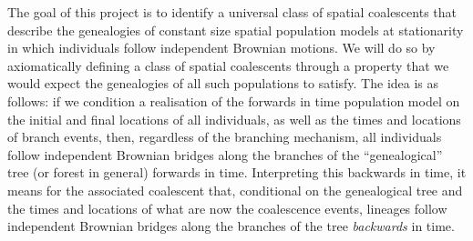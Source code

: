 \documentclass[reqno,draft]{amsart}
\numberwithin{equation}{section}
\theoremstyle{plain}
\theoremstyle{remark}
\begin{document}
The goal of this project is to identify a universal class of spatial coalescents that describe the genealogies of constant size spatial population models at stationarity in which individuals follow independent Brownian motions. We will do so by axiomatically defining a class of spatial coalescents through a property that we would expect the genealogies of all such populations to satisfy.
The idea is as follows: if we condition a realisation of the forwards in time population model on the initial and final locations of all individuals, as well as the times and locations of branch events, %
then, regardless of the branching mechanism, all individuals follow independent Brownian bridges along the branches of the ``genealogical'' tree (or forest in general) forwards in time. Interpreting this backwards in time, it means for the associated coalescent that, conditional on the genealogical tree and the times and locations of what are now the coalescence events, lineages follow independent Brownian bridges along the branches of the tree \emph{backwards} in time.
\end{document}
